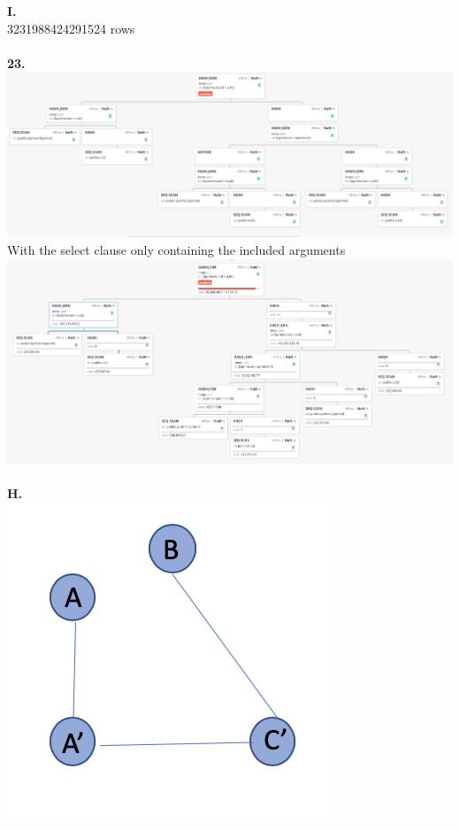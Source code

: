 \documentclass[12pt, letterpaper, fleqn]{article}
\begin{document}
  \textbf{I. }\\
  	3231988424291524 rows\\\\
  \textbf{23. }\\
  \includegraphics[scale=0.4]{query_pics/23.png} \\
  With the select clause only containing the included arguments\\
  \includegraphics[scale=0.4]{query_pics/23b.png} \\\\

  \textbf{H. }\\
  \includegraphics[scale=0.4]{query_pics/24graph.png} \\
\end{document}
